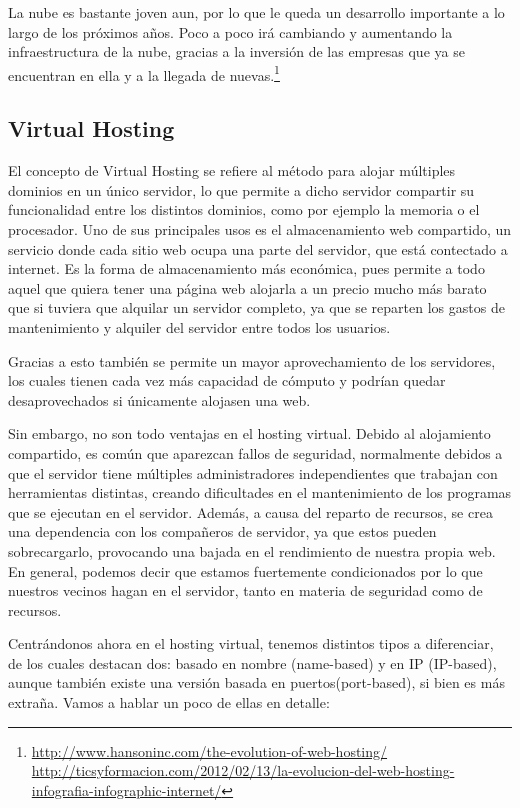 \documentclass[a4paper, 10pt]{article} %
\begin{document}
La nube es bastante joven aun, por lo que le queda un desarrollo importante a lo largo de los próximos años. Poco a poco irá cambiando y aumentando la infraestructura de la nube, gracias a la inversión de las empresas que ya se encuentran en ella y a la llegada de nuevas.\footnote{\url{http://www.hansoninc.com/the-evolution-of-web-hosting/}\\ \url{http://ticsyformacion.com/2012/02/13/la-evolucion-del-web-hosting-infografia-infographic-internet/}}

\subsection{Virtual Hosting}

El concepto de Virtual Hosting se refiere al método para alojar múltiples dominios en un único servidor, lo que permite a dicho servidor compartir su funcionalidad entre los distintos dominios, como por ejemplo la memoria o el procesador. Uno de sus principales usos es el almacenamiento web compartido, un servicio donde cada sitio web ocupa una parte del servidor, que está contectado a internet. Es la forma de almacenamiento más económica, pues permite a todo aquel que quiera tener una página web alojarla a un precio mucho más barato que si tuviera que alquilar un servidor completo, ya que se reparten los gastos de mantenimiento y alquiler del servidor entre todos los usuarios. 

Gracias a esto también se permite un mayor aprovechamiento de los servidores, los cuales tienen cada vez más capacidad de cómputo y podrían quedar desaprovechados si únicamente alojasen una web. 

Sin embargo, no son todo ventajas en el hosting virtual. Debido al alojamiento compartido, es común que aparezcan fallos de seguridad, normalmente debidos a que el servidor tiene múltiples administradores independientes que trabajan con herramientas distintas, creando dificultades en el mantenimiento de los programas que se ejecutan en el servidor. Además, a causa del reparto de recursos, se crea una dependencia con los compañeros de servidor, ya que estos pueden sobrecargarlo, provocando una bajada en el rendimiento de nuestra propia web. En general, podemos decir que estamos fuertemente condicionados por lo que nuestros vecinos hagan en el servidor, tanto en materia de seguridad como de recursos. 

Centrándonos ahora en el hosting virtual, tenemos distintos tipos a diferenciar, de los cuales destacan dos: basado en nombre (name-based) y en IP (IP-based), aunque también existe una versión basada en puertos(port-based), si bien es más extraña. Vamos a hablar un poco de ellas en detalle: 
\end{document}
